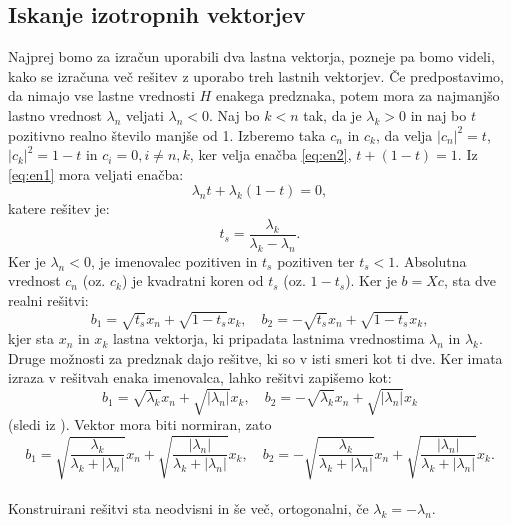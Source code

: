 \documentclass[12pt,a4paper]{amsart}
\theoremstyle{definition}
\theoremstyle{plain}
\newcommand{\abs}[1]{ \left\lvert#1\right\rvert}
\begin{document}
\subsection{Iskanje izotropnih vektorjev}
Najprej bomo za izračun uporabili dva lastna vektorja, pozneje pa bomo videli, kako se izračuna več rešitev z uporabo treh lastnih vektorjev. Če predpostavimo, da nimajo vse lastne vrednosti $H$ enakega predznaka, potem mora za najmanjšo lastno vrednost $\lambda_n$ veljati $\lambda_n <0$. 
 Naj bo $k<n$ tak, da je $\lambda_k >0$ in naj bo $t$ pozitivno realno število manjše od 1.  Izberemo taka $c_n$ in $c_k$, da velja  $\abs{c_n}^2 =t$, $\abs{c_k}^2=1-t$ in $c_i =0, i\not=n,k$, ker velja enačba \eqref{eq:en2}, $t+ (1-t)=1$. Iz \eqref{eq:en1} mora veljati enačba: $$\lambda_n t +\lambda_k (1-t)=0,$$ katere rešitev je:
\begin{equation}
t_s=\frac{\lambda_k}{\lambda_k -\lambda_n}.
\end{equation}
Ker je $\lambda_n <0$, je imenovalec pozitiven in $t_s$ pozitiven ter $t_s <1$. Absolutna vrednost $c_n$ (oz. $c_k$) je kvadratni koren od $t_s$ (oz. $1-t_s$). Ker je $b=Xc$, sta dve realni rešitvi: $$b_1=\sqrt{t_s}x_n +\sqrt{1-t_s}x_k,\quad b_2=-\sqrt{t_s}x_n+\sqrt{1-t_s}x_k,$$ kjer sta $x_n$ in $x_k$ lastna vektorja, ki pripadata lastnima vrednostima $\lambda_n$ in $\lambda_k$. Druge možnosti za predznak dajo rešitve, ki so v isti smeri kot ti dve. Ker imata izraza v rešitvah enaka imenovalca, lahko rešitvi zapišemo kot: $$b_1=\sqrt{\lambda_k}x_n+\sqrt{\abs{\lambda_n}}x_k, \quad b_2=-\sqrt{\lambda_k}x_n+\sqrt{\abs{\lambda_n}}x_k$$(sledi iz \cite{lipkin}).  Vektor mora biti normiran, zato
 $$b_1=\sqrt{\frac{\lambda_k}{\lambda_k +\abs{\lambda_n}}}x_n + \sqrt{\frac{\abs{\lambda_n}}{\lambda_k +\abs{\lambda_n}}}x_k,\quad b_2=-\sqrt{\frac{\lambda_k}{\lambda_k +\abs{\lambda_n}}}x_n + \sqrt{\frac{\abs{\lambda_n}}{\lambda_k +\abs{\lambda_n}}}x_k.$$ \\%
 Konstruirani rešitvi sta neodvisni in še več, ortogonalni, če $\lambda_k =-\lambda_n$. \\
\end{document}

